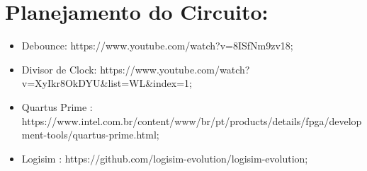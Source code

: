 \documentclass[11pt]{book}
\begin{document}
      
    \section{Planejamento do Circuito:}
    \begin{itemize}
        \item   Debounce: https://www.youtube.com/watch?v=8ISfNm9zv18;
        \item  Divisor de Clock: https://www.youtube.com/watch?v=XyIkr8OkDYU\&list=WL\&index=1;
        \item   Quartus Prime : https://www.intel.com.br/content/www/br/pt/products/details/fpga/development-tools/quartus-prime.html;
        \item Logisim : https://github.com/logisim-evolution/logisim-evolution;
  \end{itemize}
\end{document}
